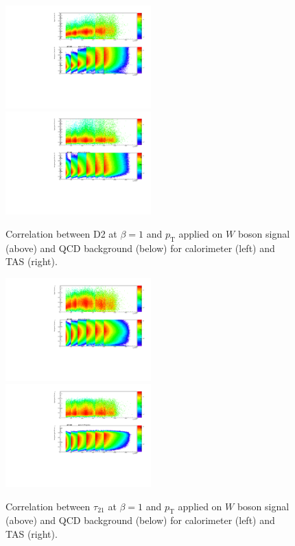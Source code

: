 \begin{figure}[htp]
\includegraphics[width=0.5\textwidth]{sascha_input/plots/W/beta1/scatter_plots/scatter_h_scatter_reco_D2.pdf}
\bigskip
\includegraphics[width=0.5\textwidth]{sascha_input/plots/W/beta1/scatter_plots/scatter_h_scatter_assisted_tj_D2.pdf} 
\caption{{Correlation between D2 at $\beta=1$ and $p_{\mathrm{T}}$ applied on $W$ boson signal (above) and QCD background (below) for calorimeter (left) and TAS (right).}}\label{fig:correlation_D2}
\end{figure}
\begin{figure}[htp]
\includegraphics[width=0.5\textwidth]{sascha_input/plots/W/beta1/scatter_plots/scatter_h_scatter_reco_nSub21.pdf}
\bigskip
\includegraphics[width=0.5\textwidth]{sascha_input/plots/W/beta1/scatter_plots/scatter_h_scatter_assisted_tj_nSub21.pdf} 
\caption{{Correlation between $\tau_{21}$ at $\beta=1$ and $p_{\mathrm{T}}$ applied on $W$ boson signal (above) and QCD background (below) for calorimeter (left) and TAS (right).}}\label{fig:correlation_tau21}
\end{figure}

